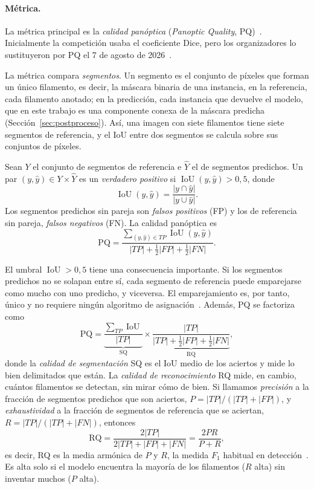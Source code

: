 \paragraph{Métrica.} La métrica principal es la \emph{calidad
panóptica} (\emph{Panoptic Quality}, PQ)~\cite{kirillov2019}. Inicialmente
la competición usaba el coeficiente Dice, pero los organizadores lo
sustituyeron por PQ el 7 de agosto de 2026~\cite{kaggle2026}.

La métrica compara \emph{segmentos}. Un segmento es el conjunto de píxeles
que forman un único filamento, es decir, la máscara binaria de una
instancia, en la referencia, cada filamento anotado; en la predicción,
cada instancia que devuelve el modelo, que en este trabajo es una
componente conexa de la máscara predicha (Sección~\ref{sec:postproceso}).
Así, una imagen con siete filamentos tiene siete segmentos de referencia,
y el IoU entre dos segmentos se calcula sobre sus conjuntos de píxeles.

\begin{definicion}
Sean $Y$ el conjunto de segmentos de referencia e $\hat Y$ el de segmentos
predichos. Un par $(y,\hat y)\in Y\times\hat Y$ es un \emph{verdadero
positivo} si $\operatorname{IoU}(y,\hat y)>0{,}5$, donde
\[
  \operatorname{IoU}(y,\hat y)=\frac{|y\cap\hat y|}{|y\cup\hat y|}.
\]
Los segmentos predichos sin pareja son \emph{falsos positivos} (FP) y los
de referencia sin pareja, \emph{falsos negativos} (FN). La calidad
panóptica es
\[
  \mathrm{PQ}=\frac{\sum_{(y,\hat y)\in \mathit{TP}}\operatorname{IoU}(y,\hat y)}
                   {|\mathit{TP}|+\tfrac12|\mathit{FP}|+\tfrac12|\mathit{FN}|}.
\]
\end{definicion}

El umbral $\operatorname{IoU}>0{,}5$ tiene una consecuencia importante. Si
los segmentos predichos no se solapan entre sí, cada segmento de
referencia puede emparejarse como mucho con uno predicho, y viceversa. El
emparejamiento es, por tanto, único y no requiere ningún algoritmo de
asignación~\cite{kirillov2019}. Además, PQ se factoriza como
\[
  \mathrm{PQ}=
  \underbrace{\frac{\sum_{\mathit{TP}}\operatorname{IoU}}{|\mathit{TP}|}}_{\mathrm{SQ}}
  \times
  \underbrace{\frac{|\mathit{TP}|}{|\mathit{TP}|+\tfrac12|\mathit{FP}|+\tfrac12|\mathit{FN}|}}_{\mathrm{RQ}},
\]
donde la \emph{calidad de segmentación} SQ es el IoU medio de los aciertos
y mide lo bien delimitados que están. La \emph{calidad de reconocimiento}
RQ mide, en cambio, cuántos filamentos se detectan, sin mirar cómo de bien.
Si llamamos \emph{precisión} a la fracción de segmentos predichos que son
aciertos, $P=|TP|/(|TP|+|FP|)$, y \emph{exhaustividad} a la fracción de
segmentos de referencia que se aciertan, $R=|TP|/(|TP|+|FN|)$, entonces
\[
  \mathrm{RQ}=\frac{2|TP|}{2|TP|+|FP|+|FN|}=\frac{2PR}{P+R},
\]
es decir, RQ es la media armónica de $P$ y $R$, la medida $F_1$ habitual
en detección~\cite{kirillov2019}. Es alta solo si el modelo encuentra la
mayoría de los filamentos ($R$ alta) sin inventar muchos ($P$ alta).

